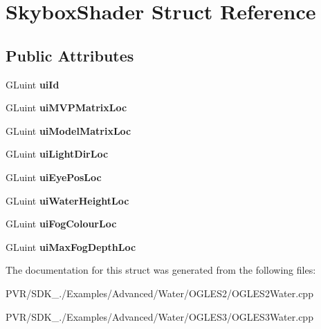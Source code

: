 \hypertarget{struct_skybox_shader}{\section{Skybox\+Shader Struct Reference}
\label{struct_skybox_shader}
}
\subsection*{Public Attributes}
\begin{DoxyCompactItemize}
\item 
\hypertarget{struct_skybox_shader_a3d237a3bccb1d24f5e24550b9a88f498}{G\+Luint {\bfseries ui\+Id}}\label{struct_skybox_shader_a3d237a3bccb1d24f5e24550b9a88f498}

\item 
\hypertarget{struct_skybox_shader_aa0317266e1620157e5f2b3ad15880fc2}{G\+Luint {\bfseries ui\+M\+V\+P\+Matrix\+Loc}}\label{struct_skybox_shader_aa0317266e1620157e5f2b3ad15880fc2}

\item 
\hypertarget{struct_skybox_shader_add32ea12e51719bb85f9efa531335d80}{G\+Luint {\bfseries ui\+Model\+Matrix\+Loc}}\label{struct_skybox_shader_add32ea12e51719bb85f9efa531335d80}

\item 
\hypertarget{struct_skybox_shader_a3b411d828a253ff0b63d2d2cb06d68d4}{G\+Luint {\bfseries ui\+Light\+Dir\+Loc}}\label{struct_skybox_shader_a3b411d828a253ff0b63d2d2cb06d68d4}

\item 
\hypertarget{struct_skybox_shader_a08989fcdce27cdc2bbab75852aacb832}{G\+Luint {\bfseries ui\+Eye\+Pos\+Loc}}\label{struct_skybox_shader_a08989fcdce27cdc2bbab75852aacb832}

\item 
\hypertarget{struct_skybox_shader_a6f929298ce8e174674f74db9fcaa6341}{G\+Luint {\bfseries ui\+Water\+Height\+Loc}}\label{struct_skybox_shader_a6f929298ce8e174674f74db9fcaa6341}

\item 
\hypertarget{struct_skybox_shader_a05316a83030193f7eaaddf21a78220e6}{G\+Luint {\bfseries ui\+Fog\+Colour\+Loc}}\label{struct_skybox_shader_a05316a83030193f7eaaddf21a78220e6}

\item 
\hypertarget{struct_skybox_shader_a95bb849888f509110799288c877b614c}{G\+Luint {\bfseries ui\+Max\+Fog\+Depth\+Loc}}\label{struct_skybox_shader_a95bb849888f509110799288c877b614c}

\end{DoxyCompactItemize}


The documentation for this struct was generated from the following files\+:\begin{DoxyCompactItemize}
\item 
P\+V\+R/\+S\+D\+K\+\_./\+Examples/\+Advanced/\+Water/\+O\+G\+L\+E\+S2/O\+G\+L\+E\+S2\+Water.\+cpp\item 
P\+V\+R/\+S\+D\+K\+\_./\+Examples/\+Advanced/\+Water/\+O\+G\+L\+E\+S3/O\+G\+L\+E\+S3\+Water.\+cpp\end{DoxyCompactItemize}
